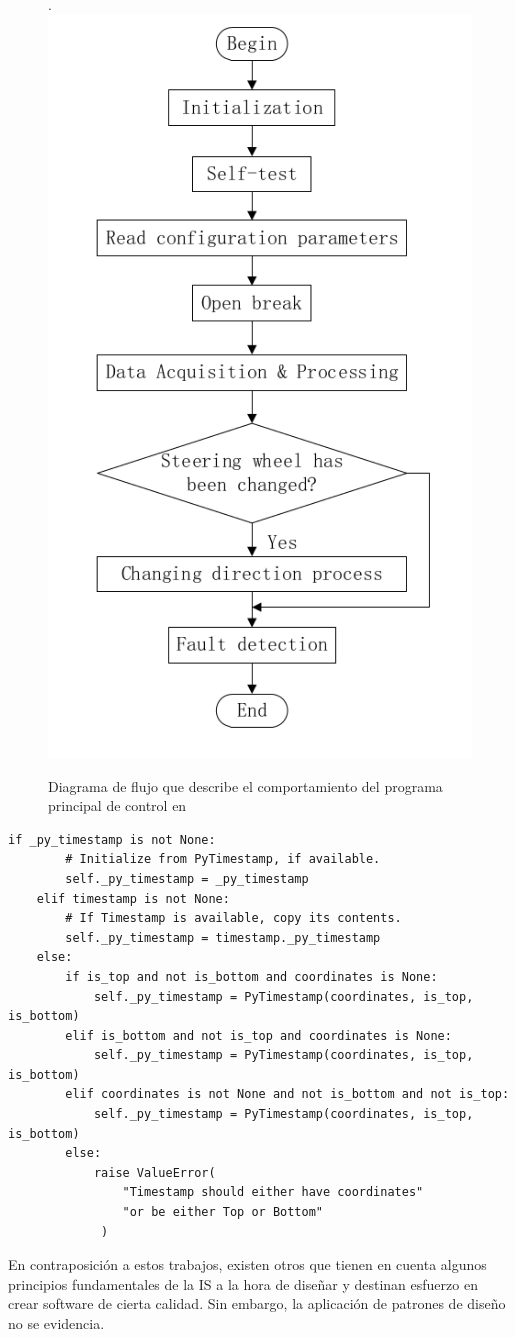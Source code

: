 \begin{figure}[H]
	\centering
	\caption{Diagrama de flujo que describe el comportamiento del programa principal de control en \cite{bad-desing-auto}}.
	\label{flujo}
    \includegraphics[width=0.5\linewidth]{main_flujo.png}
\end{figure}

\begin{lstlisting}[caption=Extracto de código de \cite{code-2}.,label={ifanidados}]
 if _py_timestamp is not None:
        # Initialize from PyTimestamp, if available.
        self._py_timestamp = _py_timestamp
    elif timestamp is not None:
        # If Timestamp is available, copy its contents.
        self._py_timestamp = timestamp._py_timestamp
    else:
        if is_top and not is_bottom and coordinates is None:
            self._py_timestamp = PyTimestamp(coordinates, is_top, is_bottom)
        elif is_bottom and not is_top and coordinates is None:
            self._py_timestamp = PyTimestamp(coordinates, is_top, is_bottom)
        elif coordinates is not None and not is_bottom and not is_top:
            self._py_timestamp = PyTimestamp(coordinates, is_top, is_bottom)
        else:
            raise ValueError(
                "Timestamp should either have coordinates"
                "or be either Top or Bottom"
             )
\end{lstlisting}


En contraposición a estos trabajos, existen otros \cite{good-desing-agrobot,good-desing-street} que tienen en cuenta algunos principios fundamentales de la IS a la hora de diseñar y destinan esfuerzo en crear software de cierta calidad. Sin embargo, la aplicación de patrones de diseño no se evidencia.

